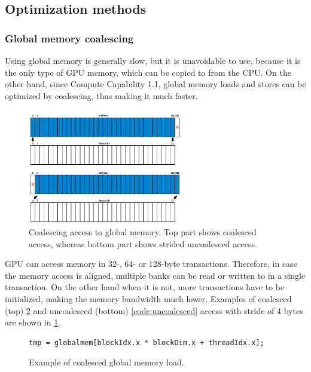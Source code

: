 \subsection{Optimization methods}\label{subsec:optimization}

\subsubsection{Global memory coalescing}\label{subsubsec:cuda-coalescing}

Using global memory is generally slow, but it is unavoidable to use, because it is the only type of GPU memory, which can be copied to from the CPU. On the other hand, since Compute Capability 1.1, global memory loads and stores can be optimized by coalescing, thus making it much faster.

\begin{center}
\begin{figure}[ht]
	\centering\includegraphics[width=0.6\textwidth]{fig/coalescing.png}
	\caption{Coalescing access to global memory. Top part shows coalesced access, whereas bottom part shows strided uncoalesced access.}\label{fig:coalescing}
\end{figure}
\end{center}

GPU can access memory in 32-, 64- or 128-byte transactions. Therefore, in case the memory access is aligned, multiple banks can be read or written to in a single transaction. On the other hand when it is not, more transactions have to be initialized, making the memory bandwidth much lower. Examples of coalesced (top) \ref{code:coalesced} and uncoalesced (bottom) \ref{code:uncoalesced} access with stride of 4 bytes are shown in \ref{fig:coalescing}.

\begin{figure}[h]
\begin{verbatim}
tmp = globalmem[blockIdx.x * blockDim.x + threadIdx.x];
\end{verbatim}
\caption{Example of coalesced global memory load.}\label{code:coalesced}
\end{figure}

